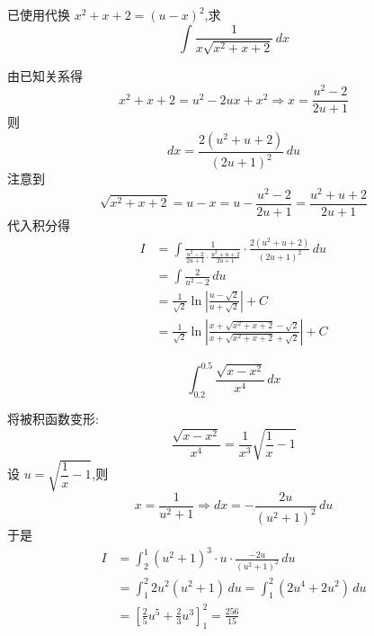 \begin{questions}
    \question 已使用代换 $x^2 + x + 2 = (u-x)^2$,求 
    \[
    \int \frac{1}{x\sqrt{x^2+x+2}} \, dx
    \]
    \begin{solution}
        由已知关系得 
        \[
        x^2 + x + 2 = u^2 - 2ux + x^2 \Rightarrow x = \frac{u^2-2}{2u+1}
        \]
        则
        \[
        dx = \frac{2(u^2+u+2)}{(2u+1)^2} \, du
        \]
        注意到 
        \[
        \sqrt{x^2+x+2} = u-x = u - \frac{u^2-2}{2u+1} = \frac{u^2+u+2}{2u+1}
        \]
        代入积分得
        \begin{align*}
        I &= \int \frac{1}{\frac{u^2-2}{2u+1} \cdot \frac{u^2+u+2}{2u+1}} \cdot \frac{2(u^2+u+2)}{(2u+1)^2} \, du \\
        &= \int \frac{2}{u^2-2} \, du \\
        &= \frac{1}{\sqrt{2}} \ln \left| \frac{u-\sqrt{2}}{u+\sqrt{2}} \right| + C \\
        &= \frac{1}{\sqrt{2}} \ln \left| \frac{x + \sqrt{x^2+x+2} - \sqrt{2}}{x + \sqrt{x^2+x+2} + \sqrt{2}} \right| + C
        \end{align*}
    \end{solution}

    \question 
    \[
    \int_{0.2}^{0.5} \frac{\sqrt{x-x^2}}{x^4} \, dx
    \]
    \begin{solution}
        将被积函数变形:
        \[
        \frac{\sqrt{x-x^2}}{x^4} = \frac{1}{x^3}\sqrt{\frac{1}{x}-1}
        \]
        设 $u = \sqrt{\dfrac{1}{x}-1}$,则 
        \[
        x = \frac{1}{u^2+1} \Rightarrow dx = -\frac{2u}{(u^2+1)^2} \, du
        \]
        于是
        \begin{align*}
        I &= \int_{2}^{1} (u^2+1)^3 \cdot u \cdot \frac{-2u}{(u^2+1)^2} \, du \\
        &= \int_{1}^{2} 2u^2(u^2+1) \, du = \int_{1}^{2} (2u^4 + 2u^2) \, du \\
        &= \left[ \frac{2}{5}u^5 + \frac{2}{3}u^3 \right]_{1}^{2} = \frac{256}{15}
        \end{align*}
    \end{solution}


\end{questions}

